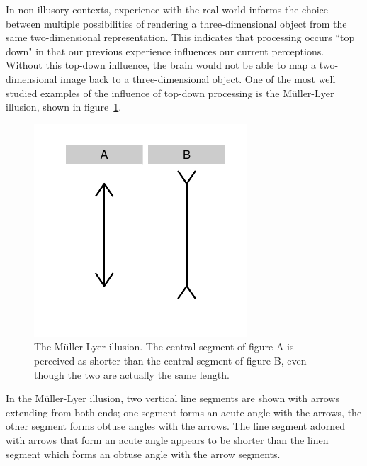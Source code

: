 \documentclass[11pt]{isuthesis}\usepackage[]{graphicx}\usepackage[]{color}
\begin{document}
In non-illusory contexts, experience with the real world informs the choice between multiple possibilities of rendering a three-dimensional object from the same two-dimensional representation. This indicates that processing occurs ``top down" in that our previous experience influences our current perceptions. Without this top-down influence, the brain would not be able to map a two-dimensional image back to a three-dimensional object. One of the most well studied examples of the influence of top-down processing is the M\"uller-Lyer illusion, shown in figure~\ref{fig:mullerlyer}.

\begin{figure}\centering
\includegraphics[keepaspectratio=TRUE, trim=0in .3in 0in .3in]{fig-mullerlyer}
\caption[The M\"uller-Lyer illusion]{The M\"uller-Lyer illusion. The central segment of figure A is perceived as shorter than the central segment  of figure B, even though the two are actually the same length.}
\label{fig:mullerlyer}
\end{figure}

In the M\"uller-Lyer illusion, two vertical line segments are shown with arrows extending from both ends; one segment forms an acute angle with the arrows, the other segment forms obtuse angles with the arrows. The line segment adorned with arrows that form an acute angle appears to be shorter than the linen segment which forms an obtuse angle with the arrow segments. 
\end{document}
